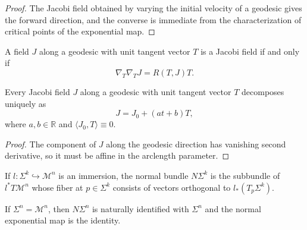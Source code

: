\begin{proof}
The Jacobi field obtained by varying the initial velocity of a geodesic gives the forward direction, and the converse is immediate from the characterization of critical points of the exponential map.
\end{proof}

\begin{lemma}
\label{appb-lem-jacobi-equation}
A field $J$ along a geodesic with unit tangent vector $T$ is a Jacobi field if and only if
\[
\nabla_T\nabla_T J = R(T,J)T.
\]
\end{lemma}

\begin{corollary}
\label{appb-cor-jacobi-orthogonal-decomposition}
Every Jacobi field $J$ along a geodesic with unit tangent vector $T$ decomposes uniquely as
\[
J = J_0 + (at+b)T,
\]
where $a,b\in\mathbb R$ and $\langle J_0,T\rangle\equiv 0$.
\end{corollary}

\begin{proof}
The component of $J$ along the geodesic direction has vanishing second derivative, so it must be affine in the arclength parameter.
\end{proof}

\begin{definition}
\label{appb-def-normal-bundle}
If $l:\Sigma^k\hookrightarrow \mathcal M^n$ is an immersion, the normal bundle $N\Sigma^k$ is the subbundle of $l^*T\mathcal M^n$ whose fiber at $p\in\Sigma^k$ consists of vectors orthogonal to $l_*(T_p\Sigma^k)$.
\end{definition}

\begin{example}
\label{appb-ex-normal-bundle-codim-zero}
If $\Sigma^n=\mathcal M^n$, then $N\Sigma^n$ is naturally identified with $\Sigma^n$ and the normal exponential map is the identity.
\end{example}

